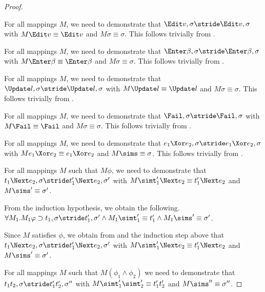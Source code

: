 \begin{proof}
{    }

  {For all mappings $M$, we need to demonstrate that
  $\Edit v,\sigma\stride \Edit v,\sigma$ with $M\Edit v \equiv \Edit v$ and $M\sigma \equiv \sigma$.
  This follows trivially from .

  }

  {For all mappings $M$, we need to demonstrate that $\Enter\beta,\sigma\stride\Enter\beta,\sigma$ with
  $M\Enter \beta \equiv \Enter \beta$ and $M\sigma \equiv {\sigma}$.
  This follows trivially from .
  }

  {For all mappings $M$, we need to demonstrate that $\Update l,\sigma\stride\Update l,\sigma$ with
  $M\Update l \equiv \Update l$ and $M\sigma \equiv {\sigma}$.
  This follows trivially from .
  }

  {For all mappings $M$, we need to demonstrate that $\Fail,\sigma\stride\Fail,\sigma$
  with
  $M\Fail \equiv \Fail$ and $M\sigma \equiv {\sigma}$.
  This follows trivially from .
  }

  {For all mappings $M$, we need to demonstrate that $e_1\Xor e_2,\sigma\stride e_1\Xor e_2,\sigma$ with
  $M e_1\Xor e_2 \equiv e_1\Xor e_2$ and $M\sims \equiv {\sigma}$.
  This follows trivially from .
  }

  {For all mappings $M$ such that $M\phi$,
  we need to demonstrate that\\
  $t_1\Next e_2,\sigma\stride t_1'\Next e_2,\sigma'$ with
  $M \simt_1'\Next e_2\equiv {t_1'}\Next e_2$ and $M \sims'\equiv{\sigma'}$.

  From the induction hypothesis, we obtain the following.\\
  $\forall M_1 . M_1 \phi \implies t_1,\sigma {\stride} {t_1'},{\sigma'}\land M_1 \simt_1'\equiv{t_1'}\land M_1\sims' \equiv{\sigma'}$.

  Since $M$ satisfies $\phi$, we obtain from  and the induction step above that $t_1\Next e_2,\sigma\stride t_1'\Next e_2,\sigma'$ with
  $M \simt_1'\Next e_2\equiv {t_1'}\Next e_2$ and $M \sims'\equiv{\sigma'}$.

  }

  {For all mappings $M$ such that $M(\phi_1\land \phi_2)$
  we need to demonstrate that $t_1\And t_2,\sigma\stride t_1'\And t_2',\sigma''$ with
  $M \simt_1'\And \simt_2'\equiv {t_1'}\And{t_2'}$ and $M\sims''\equiv {\sigma''}$.

}
\end{proof}
